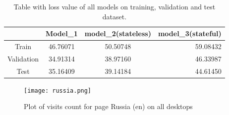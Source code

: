 \begin{table}[htbp]
	\centering
	\begin{tabular}{|c|c|c|r|}
		\hline
		& Model\_1 & model\_2(stateless) & \multicolumn{1}{l|}{model\_3(stateful)} \\ \hline
		Train & 46.76071 & 50.50748 & 59.08432 \\ \hline
		Validation & 34.91314 & 38.97160 & 46.33987 \\ \hline
		Test & 35.16409 & 39.14184 & 44.61450 \\ \hline
	\end{tabular}
	\vspace{1mm}
	\caption{Table with loss value of all models on training, validation and test dataset.\label{tab:results}}
\end{table}

\begin{figure}
	\centering
	\texttt{[image: russia.png]}
	\caption{Plot of visits count for page Russia (en) on all desktops\label{fig:russia}}
\end{figure}
